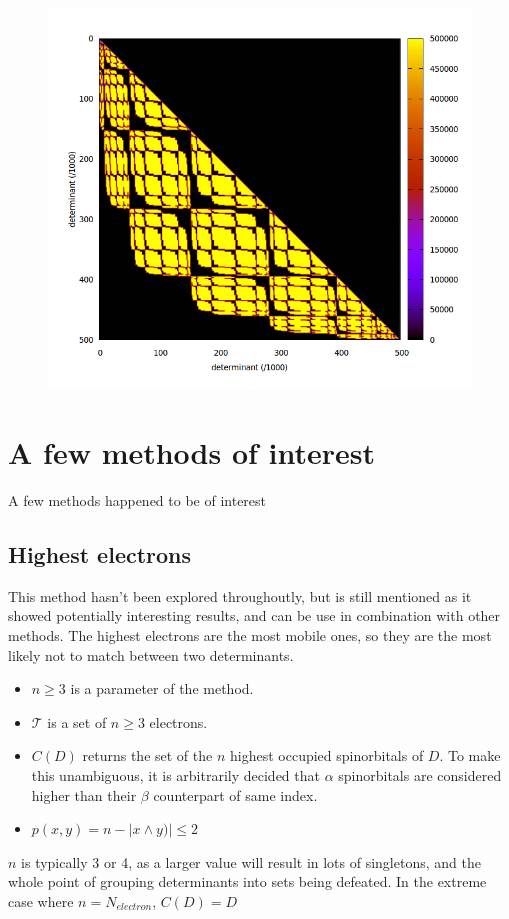 \documentclass[./thesis.tex]{subfiles}
\begin{document}
\begin{figure}[h!]
	\begin{center}
		\includegraphics[width=0.6\columnwidth]{figures/davidson/num_subspace3}
		\caption{{\label{fig:num_subspace3}
		}}
	\end{center}
\end{figure}


\section{A few methods of interest}

A few methods happened to be of interest
\subsection{Highest electrons}
This method hasn't been explored throughoutly, but is still mentioned as it showed potentially interesting results, and can be use in combination with other methods.
The highest electrons are the most mobile ones, so they are the most likely not to match between two determinants. 

\begin{itemize}
	\item
$n \geq 3$ is a parameter of the method. 
	\item
$\mathcal{T}$ is a set of $n \geq 3$ electrons. 
	\item
$C(D)$ returns the set of the $n$ highest occupied spinorbitals of $D$. To make this unambiguous, it is arbitrarily decided that $\alpha$ spinorbitals are considered higher than their $\beta$ counterpart of same index.
	\item
$p(x, y) = n - |x \wedge y)| \leq 2$
\end{itemize}

$n$ is typically 3 or 4, as a larger value will result in lots of singletons, and the whole point of grouping determinants into sets being defeated. In the extreme case where $n = N_{electron}$, $C(D) = D$
   
\end{document}
